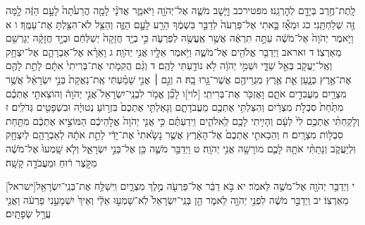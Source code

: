 \documentclass[twoside, openany, parskip=half, 11pt]{book}
\begin{document}
לָֽתֶת־חֶ֥רֶב בְּיָדָ֖ם לְהׇרְגֵֽנוּ׃ מפטירכב וַיָּ֧שׇׁב מֹשֶׁ֛ה אֶל־יְהֹוָ֖ה וַיֹּאמַ֑ר אֲדֹנָ֗י לָמָ֤ה הֲרֵעֹ֙תָה֙ לָעָ֣ם הַזֶּ֔ה לָ֥מָּה זֶּ֖ה שְׁלַחְתָּֽנִי׃ כג וּמֵאָ֞ז בָּ֤אתִי אֶל־פַּרְעֹה֙ לְדַבֵּ֣ר בִּשְׁמֶ֔ךָ הֵרַ֖ע לָעָ֣ם הַזֶּ֑ה וְהַצֵּ֥ל לֹא־הִצַּ֖לְתָּ אֶת־עַמֶּֽךָ׃ ו א וַיֹּ֤אמֶר יְהֹוָה֙ אֶל־מֹשֶׁ֔ה עַתָּ֣ה תִרְאֶ֔ה אֲשֶׁ֥ר אֶֽעֱשֶׂ֖ה לְפַרְעֹ֑ה כִּ֣י בְיָ֤ד חֲזָקָה֙ יְשַׁלְּחֵ֔ם וּבְיָ֣ד חֲזָקָ֔ה יְגָרְשֵׁ֖ם מֵאַרְצֽוֹ׃
ד ואראב וַיְדַבֵּ֥ר אֱלֹהִ֖ים אֶל־מֹשֶׁ֑ה וַיֹּ֥אמֶר אֵלָ֖יו אֲנִ֥י יְהֹוָֽה׃ ג וָאֵרָ֗א אֶל־אַבְרָהָ֛ם אֶל־יִצְחָ֥ק וְאֶֽל־יַעֲקֹ֖ב בְּאֵ֣ל שַׁדָּ֑י וּשְׁמִ֣י יְהֹוָ֔ה לֹ֥א נוֹדַ֖עְתִּי לָהֶֽם׃ ד וְגַ֨ם הֲקִמֹ֤תִי אֶת־בְּרִיתִי֙ אִתָּ֔ם לָתֵ֥ת לָהֶ֖ם אֶת־אֶ֣רֶץ כְּנָ֑עַן אֵ֛ת אֶ֥רֶץ מְגֻרֵיהֶ֖ם אֲשֶׁר־גָּ֥רוּ בָֽהּ׃ ה וְגַ֣ם ׀ אֲנִ֣י שָׁמַ֗עְתִּי אֶֽת־נַאֲקַת֙ בְּנֵ֣י יִשְׂרָאֵ֔ל אֲשֶׁ֥ר מִצְרַ֖יִם מַעֲבִדִ֣ים אֹתָ֑ם וָאֶזְכֹּ֖ר אֶת־בְּרִיתִֽי׃ [לוי]ו לָכֵ֞ן אֱמֹ֥ר לִבְנֵֽי־יִשְׂרָאֵל֮ אֲנִ֣י יְהֹוָה֒ וְהוֹצֵאתִ֣י אֶתְכֶ֗ם מִתַּ֙חַת֙ סִבְלֹ֣ת מִצְרַ֔יִם וְהִצַּלְתִּ֥י אֶתְכֶ֖ם מֵעֲבֹדָתָ֑ם וְגָאַלְתִּ֤י אֶתְכֶם֙ בִּזְר֣וֹעַ נְטוּיָ֔ה וּבִשְׁפָטִ֖ים גְּדֹלִֽים׃ ז וְלָקַחְתִּ֨י אֶתְכֶ֥ם לִי֙ לְעָ֔ם וְהָיִ֥יתִי לָכֶ֖ם לֵֽאלֹהִ֑ים וִֽידַעְתֶּ֗ם כִּ֣י אֲנִ֤י יְהֹוָה֙ אֱלֹ֣הֵיכֶ֔ם הַמּוֹצִ֣יא אֶתְכֶ֔ם מִתַּ֖חַת סִבְל֥וֹת מִצְרָֽיִם׃ ח וְהֵבֵאתִ֤י אֶתְכֶם֙ אֶל־הָאָ֔רֶץ אֲשֶׁ֤ר נָשָׂ֙אתִי֙ אֶת־יָדִ֔י לָתֵ֣ת אֹתָ֔הּ לְאַבְרָהָ֥ם לְיִצְחָ֖ק וּֽלְיַעֲקֹ֑ב וְנָתַתִּ֨י אֹתָ֥הּ לָכֶ֛ם מוֹרָשָׁ֖ה אֲנִ֥י יְהֹוָֽה׃ ט וַיְדַבֵּ֥ר מֹשֶׁ֛ה כֵּ֖ן אֶל־בְּנֵ֣י יִשְׂרָאֵ֑ל וְלֹ֤א שָֽׁמְעוּ֙ אֶל־מֹשֶׁ֔ה מִקֹּ֣צֶר ר֔וּחַ וּמֵעֲבֹדָ֖ה קָשָֽׁה׃

[ישראל]י וַיְדַבֵּ֥ר יְהֹוָ֖ה אֶל־מֹשֶׁ֥ה לֵּאמֹֽר׃ יא בֹּ֣א דַבֵּ֔ר אֶל־פַּרְעֹ֖ה מֶ֣לֶךְ מִצְרָ֑יִם וִֽישַׁלַּ֥ח אֶת־בְּנֵֽי־יִשְׂרָאֵ֖ל מֵאַרְצֽוֹ׃ יב וַיְדַבֵּ֣ר מֹשֶׁ֔ה לִפְנֵ֥י יְהֹוָ֖ה לֵאמֹ֑ר הֵ֤ן בְּנֵֽי־יִשְׂרָאֵל֙ לֹֽא־שָׁמְע֣וּ אֵלַ֔י וְאֵיךְ֙ יִשְׁמָעֵ֣נִי פַרְעֹ֔ה וַאֲנִ֖י עֲרַ֥ל שְׂפָתָֽיִם׃
\end{document}
